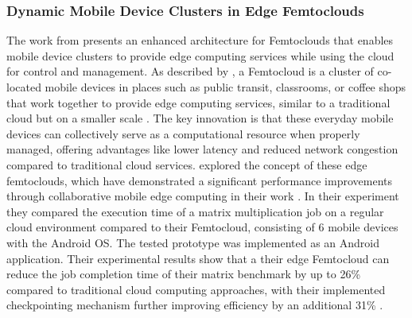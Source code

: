 \subsubsection{Dynamic Mobile Device Clusters in Edge Femtoclouds}
The work from \citeauthor{relatedwork:mobilecloud} \cite{relatedwork:mobilecloud} presents an enhanced architecture for Femtoclouds that enables mobile device clusters to provide edge computing services while using the cloud for control and management. As described by \citeauthor{relatedwork:mobilecloud}, a Femtocloud is a cluster of co-located mobile devices in places such as public transit, classrooms, or coffee shops that work together to provide edge computing services, similar to a traditional cloud but on a smaller scale \cite{relatedwork:mobilecloud}. The key innovation is that these everyday mobile devices can collectively serve as a computational resource when properly managed, offering advantages like lower latency and reduced network congestion compared to traditional cloud services. \citeauthor{relatedwork:mobilecloud} explored the concept of these edge femtoclouds, which have demonstrated a significant performance improvements through collaborative mobile edge computing in their work \cite{relatedwork:mobilecloud}. In their experiment they compared the execution time of a matrix multiplication job on a regular cloud environment compared to their Femtocloud, consisting of 6 mobile devices with the Android \ac{OS}. The tested prototype was implemented as an Android application. Their experimental results show that a their edge Femtocloud can reduce the job completion time of their matrix benchmark by up to 26\% compared to traditional cloud computing approaches, with their implemented checkpointing mechanism further improving efficiency by an additional 31\% \cite{relatedwork:mobilecloud}. 

